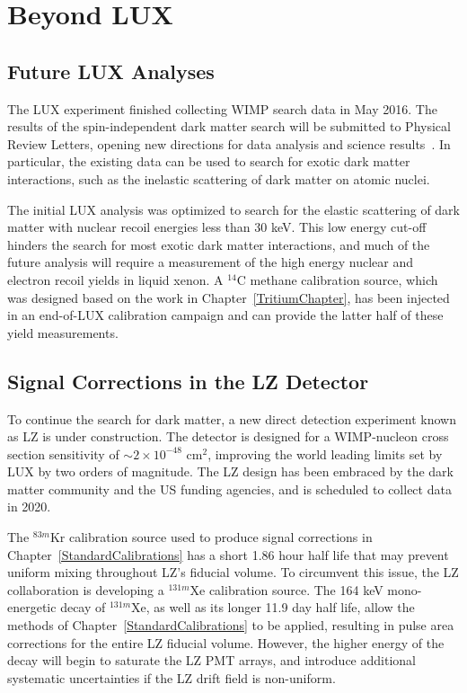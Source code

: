 \section{Beyond LUX} \label{LZChapter}

\subsection{Future LUX Analyses}

The LUX experiment finished collecting WIMP search data in May 2016.  The results of the spin-independent dark matter search will be submitted to Physical Review Letters, opening new directions for data analysis and science results~\cite{Akerib:2016vxi}.  In particular, the existing data can be used to search for exotic dark matter interactions, such as the inelastic scattering of dark matter on atomic nuclei.  

The initial LUX analysis was optimized to search for the elastic scattering of dark matter with nuclear recoil energies less than 30 keV.  This low energy cut-off hinders the search for most exotic dark matter interactions, and much of the future analysis will require a measurement of the high energy nuclear and electron recoil yields in liquid xenon.  A $^{14}$C methane calibration source, which was designed based on the work in Chapter~\ref{TritiumChapter}, has been injected in an end-of-LUX calibration campaign and can provide the latter half of these yield measurements.


\subsection{Signal Corrections in the LZ Detector}

To continue the search for dark matter, a new direct detection experiment known as LZ is under construction.  The detector is designed for a WIMP-nucleon cross section sensitivity of $\sim 2 \times 10^{-48}$ cm$^2$, improving the world leading limits set by LUX by two orders of magnitude.  The LZ design has been embraced by the dark matter community and the US funding agencies, and is scheduled to collect data in 2020.

The $^{83m}$Kr calibration source used to produce signal corrections in Chapter~\ref{StandardCalibrations} has a short 1.86 hour half life that may prevent uniform mixing throughout LZ's fiducial volume.  To circumvent this issue, the LZ collaboration is developing a $^{131m}$Xe calibration source.  The 164 keV mono-energetic decay of $^{131m}$Xe, as well as its longer 11.9 day half life, allow the methods of Chapter~\ref{StandardCalibrations} to be applied, resulting in pulse area corrections for the entire LZ fiducial volume.  However, the higher energy of the decay will begin to saturate the LZ PMT arrays, and introduce additional systematic uncertainties if the LZ drift field is non-uniform. 

